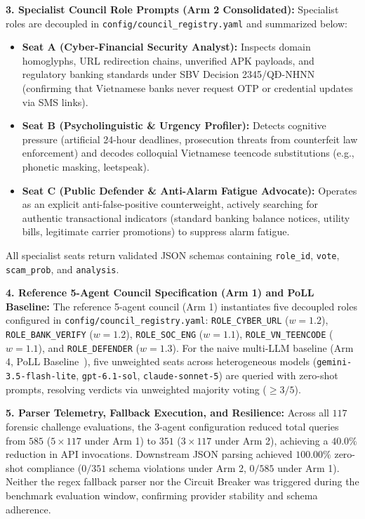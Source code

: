 \documentclass[journal]{IEEEtran}
\begin{document}
\textbf{3. Specialist Council Role Prompts (Arm 2 Consolidated):}
Specialist roles are decoupled in \texttt{config/council\_registry.yaml} and summarized below:
\begin{itemize}
    \item \textbf{Seat A (Cyber-Financial Security Analyst):} Inspects domain homoglyphs, URL redirection chains, unverified APK payloads, and regulatory banking standards under SBV Decision 2345/QĐ-NHNN (confirming that Vietnamese banks never request OTP or credential updates via SMS links).
    \item \textbf{Seat B (Psycholinguistic \& Urgency Profiler):} Detects cognitive pressure (artificial 24-hour deadlines, prosecution threats from counterfeit law enforcement) and decodes colloquial Vietnamese teencode substitutions (e.g., phonetic masking, leetspeak).
    \item \textbf{Seat C (Public Defender \& Anti-Alarm Fatigue Advocate):} Operates as an explicit anti-false-positive counterweight, actively searching for authentic transactional indicators (standard banking balance notices, utility bills, legitimate carrier promotions) to suppress alarm fatigue.
\end{itemize}
All specialist seats return validated JSON schemas containing \texttt{role\_id}, \texttt{vote}, \texttt{scam\_prob}, and \texttt{analysis}.

\textbf{4. Reference 5-Agent Council Specification (Arm 1) and PoLL Baseline:}
The reference 5-agent council (Arm 1) instantiates five decoupled roles configured in \texttt{config/council\_registry.yaml}: \texttt{ROLE\_CYBER\_URL} ($w=1.2$), \texttt{ROLE\_BANK\_VERIFY} ($w=1.2$), \texttt{ROLE\_SOC\_ENG} ($w=1.1$), \texttt{ROLE\_VN\_TEENCODE} ($w=1.1$), and \texttt{ROLE\_DEFENDER} ($w=1.3$). For the naive multi-LLM baseline (Arm 4, PoLL Baseline~\cite{chan2024chateval, verga2024poll}), five unweighted seats across heterogeneous models (\texttt{gemini-3.5-flash-lite}, \texttt{gpt-6.1-sol}, \texttt{claude-sonnet-5}) are queried with zero-shot prompts, resolving verdicts via unweighted majority voting ($\ge 3/5$).

\textbf{5. Parser Telemetry, Fallback Execution, and Resilience:}
Across all $117$ forensic challenge evaluations, the 3-agent configuration reduced total queries from $585$ ($5 \times 117$ under Arm 1) to $351$ ($3 \times 117$ under Arm 2), achieving a $40.0\%$ reduction in API invocations. Downstream JSON parsing achieved $100.00\%$ zero-shot compliance ($0/351$ schema violations under Arm 2, $0/585$ under Arm 1). Neither the regex fallback parser nor the Circuit Breaker was triggered during the benchmark evaluation window, confirming provider stability and schema adherence.
\end{document}
